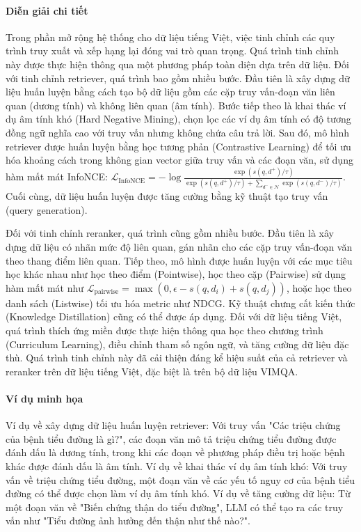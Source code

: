 \documentclass{article}
\begin{document}
\paragraph{Diễn giải chi tiết}
Trong phần mở rộng hệ thống cho dữ liệu tiếng Việt, việc tinh chỉnh các quy trình truy xuất và xếp hạng lại đóng vai trò quan trọng. Quá trình tinh chỉnh này được thực hiện thông qua một phương pháp toàn diện dựa trên dữ liệu. Đối với tinh chỉnh retriever, quá trình bao gồm nhiều bước. Đầu tiên là xây dựng dữ liệu huấn luyện bằng cách tạo bộ dữ liệu gồm các cặp truy vấn-đoạn văn liên quan (dương tính) và không liên quan (âm tính). Bước tiếp theo là khai thác ví dụ âm tính khó (Hard Negative Mining), chọn lọc các ví dụ âm tính có độ tương đồng ngữ nghĩa cao với truy vấn nhưng không chứa câu trả lời. Sau đó, mô hình retriever được huấn luyện bằng học tương phản (Contrastive Learning) để tối ưu hóa khoảng cách trong không gian vector giữa truy vấn và các đoạn văn, sử dụng hàm mất mát InfoNCE: $\mathcal{L}_{\text{InfoNCE}} = -\log \frac{\exp(s(q, d^+)/\tau)}{\exp(s(q, d^+)/\tau) + \sum_{d^- \in \mathcal{N}} \exp(s(q, d^-)/\tau)}$. Cuối cùng, dữ liệu huấn luyện được tăng cường bằng kỹ thuật tạo truy vấn (query generation).

Đối với tinh chỉnh reranker, quá trình cũng gồm nhiều bước. Đầu tiên là xây dựng dữ liệu có nhãn mức độ liên quan, gán nhãn cho các cặp truy vấn-đoạn văn theo thang điểm liên quan. Tiếp theo, mô hình được huấn luyện với các mục tiêu học khác nhau như học theo điểm (Pointwise), học theo cặp (Pairwise) sử dụng hàm mất mát như $\mathcal{L}_{\text{pairwise}} = \max(0, \epsilon - s(q, d_i) + s(q, d_j))$, hoặc học theo danh sách (Listwise) tối ưu hóa metric như NDCG. Kỹ thuật chưng cất kiến thức (Knowledge Distillation) cũng có thể được áp dụng. Đối với dữ liệu tiếng Việt, quá trình thích ứng miền được thực hiện thông qua học theo chương trình (Curriculum Learning), điều chỉnh tham số ngôn ngữ, và tăng cường dữ liệu đặc thù. Quá trình tinh chỉnh này đã cải thiện đáng kể hiệu suất của cả retriever và reranker trên dữ liệu tiếng Việt, đặc biệt là trên bộ dữ liệu VIMQA.

\paragraph{Ví dụ minh họa}
Ví dụ về xây dựng dữ liệu huấn luyện retriever: Với truy vấn "Các triệu chứng của bệnh tiểu đường là gì?", các đoạn văn mô tả triệu chứng tiểu đường được đánh dấu là dương tính, trong khi các đoạn về phương pháp điều trị hoặc bệnh khác được đánh dấu là âm tính. Ví dụ về khai thác ví dụ âm tính khó: Với truy vấn về triệu chứng tiểu đường, một đoạn văn về các yếu tố nguy cơ của bệnh tiểu đường có thể được chọn làm ví dụ âm tính khó. Ví dụ về tăng cường dữ liệu: Từ một đoạn văn về "Biến chứng thận do tiểu đường", LLM có thể tạo ra các truy vấn như "Tiểu đường ảnh hưởng đến thận như thế nào?".
\end{document}

